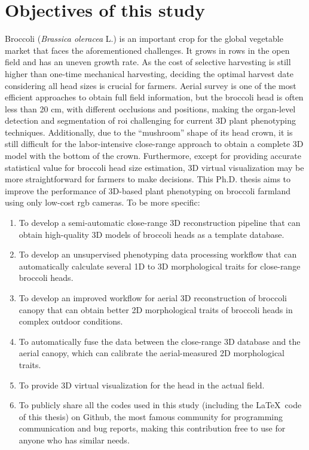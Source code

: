 
\section{Objectives of this study}

Broccoli (\textit{Brassica oleracea} L.) is an important crop for the global vegetable market that faces the aforementioned challenges. It grows in rows in the open field and has an uneven growth rate. As the cost of selective harvesting is still higher than one-time mechanical harvesting, deciding the optimal harvest date considering all head sizes is crucial for farmers. Aerial survey is one of the most efficient approaches to obtain full field information, but the broccoli head is often less than 20 cm, with different occlusions and positions, making the organ-level detection and segmentation of \gls{roi} challenging for current 3D plant phenotyping techniques. Additionally, due to the ``mushroom'' shape of its head crown, it is still difficult for the labor-intensive close-range approach to obtain a complete 3D model with the bottom of the crown. Furthermore, except for providing accurate statistical value for broccoli head size estimation, 3D virtual visualization may be more straightforward for farmers to make decisions. This Ph.D. thesis aims to improve the performance of 3D-based plant phenotyping on broccoli farmland using only low-cost \gls{rgb} cameras. To be more specific:

\begin{enumerate}
    \item To develop a semi-automatic close-range 3D reconstruction pipeline that can obtain high-quality 3D models of broccoli heads as a template database.
    \item To develop an unsupervised phenotyping data processing workflow that can automatically calculate several 1D to 3D morphological traits for close-range broccoli heads.
    \item To develop an improved workflow for aerial 3D reconstruction of broccoli canopy that can obtain better 2D morphological traits of broccoli heads in complex outdoor conditions.
    \item To automatically fuse the data between the close-range 3D database and the aerial canopy, which can calibrate the aerial-measured 2D morphological traits.
    \item To provide 3D virtual visualization for the head in the actual field.
    \item To publicly share all the codes used in this study (including the \LaTeX~code of this thesis) on Github, the most famous community for programming communication and bug reports, making this contribution free to use for anyone who has similar needs.
\end{enumerate}


